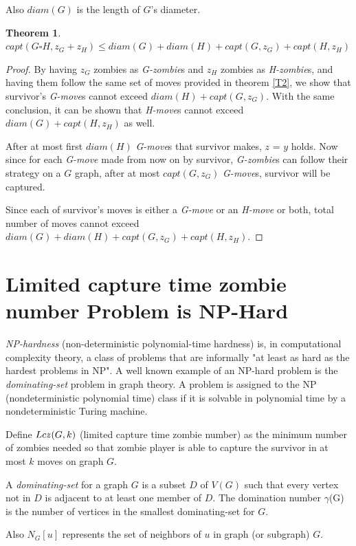 \documentclass[1p]{elsarticle}
\newtheorem{theorem}{Theorem}
\newcommand{\zn}{\ooalign{$z$\cr\hfil\rule[.5ex]{.2em}{.08ex}\hfil\cr}}
\begin{document}
	Also $diam(G)$ is the length of $G$'s diameter.
	\begin{theorem}
		\label{T5}
		$capt( G \square H, z_G + z_H ) \leq diam(G) + diam(H) + capt(G, z_G) + capt(H, z_H)$
	\end{theorem}
	\begin{proof}
		By having $z_G$ zombies as {\it G-zombie}s and $z_H$ zombies as {\it H-zombie}s, and having them follow the same
		set of moves provided in theorem \ref{T2}, we show that survivor's {\it G-move}s cannot exceed $diam(H)
		+ capt(G, z_G)$. With the same conclusion, it can be shown that {\it H-move}s cannot exceed $diam(G) + capt(H, z_H)$
		as well.

		After at most first $diam(H)$ {\it G-move}s that survivor makes, $z$ = $y$ holds. Now since for each {\it
		G-move} made from now on by survivor, {\it G-zombie}s can follow their strategy on a $G$ graph, after at most
		$capt(G,z_G)$ {\it G-move}s, survivor will be captured. 
		
		Since each of survivor's moves is either a {\it G-move} or an {\it H-move} or both, total number of moves cannot
		exceed $diam(G) + diam(H) + capt(G, z_G) + capt(H, z_H)$.
	\end{proof}
\section{Limited capture time zombie number Problem is NP-Hard}\label{np-capturetime}

	{\it NP-hardness} (non-deterministic polynomial-time hardness) is, in computational complexity theory, a class of problems
	that are informally "at least as hard as the hardest problems in NP". A well known example of an NP-hard problem is
	the {\it dominating-set} problem in graph theory. A problem is assigned to the NP (nondeterministic polynomial time) class
	if it is solvable in polynomial time by a nondeterministic Turing machine.


	Define $Lc\zn(G,k)$ (limited capture time zombie number) as the minimum number of zombies needed so that zombie player is able to capture the survivor in
	at most $k$ moves on graph $G$. 

	A {\it dominating-set} for a graph $G$ is a subset $D$ of $V(G)$ such that every vertex not in $D$ is adjacent
	to at least one member of $D$. The domination number $\gamma$(G) is the number of vertices in the smallest
	dominating-set for $G$.

	Also $N_G[u]$ represents the set of neighbors of $u$ in graph (or subgraph) $G$.
	
\end{document}
